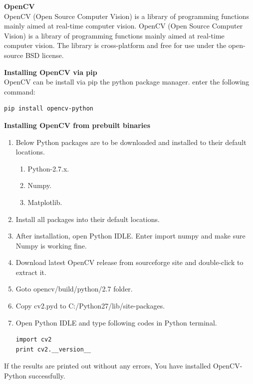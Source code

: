 \noindent\textbf{OpenCV}\\OpenCV (Open Source Computer Vision) is a library of programming functions mainly aimed at real-time computer vision. OpenCV (Open Source Computer Vision) is a library of programming functions mainly aimed at real-time computer vision. The library is cross-platform and free for use under the open-source BSD license.

\noindent\textbf{Installing OpenCV via pip}\\OpenCV can be install via pip the python package manager. enter the following command:
\begin{lstlisting}
pip install opencv-python
\end{lstlisting}
\noindent\textbf{Installing OpenCV from prebuilt binaries}
\begin{enumerate}
	\item Below Python packages are to be downloaded and installed to their default locations.
	\begin{enumerate}
		\item Python-2.7.x.
		\item Numpy.
		\item Matplotlib.
	\end{enumerate}
	\item Install all packages into their default locations.
	\item After installation, open Python IDLE. Enter import numpy and make sure Numpy is working fine.
	\item Download latest OpenCV release from sourceforge site and double-click to extract it.
	\item Goto opencv/build/python/2.7 folder.
	\item Copy cv2.pyd to C:/Python27/lib/site-packages.
	\item Open Python IDLE and type following codes in Python terminal.
	\begin{lstlisting}
import cv2
print cv2.__version__
	\end{lstlisting}
\end{enumerate}
If the results are printed out without any errors, You have installed OpenCV-Python successfully.
\pagebreak

